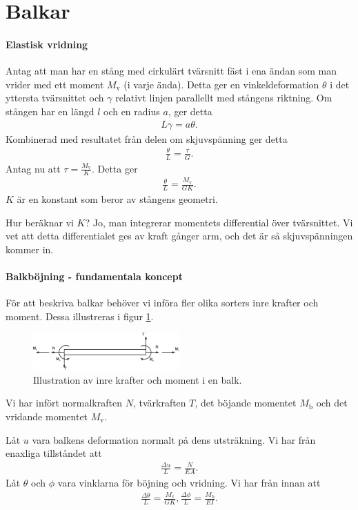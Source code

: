 \section{Balkar}

\paragraph{Elastisk vridning}
Antag att man har en stång med cirkulärt tvärsnitt fäst i ena ändan som man vrider med ett moment $M_{\text{v}}$ (i varje ända). Detta ger en vinkeldeformation $\theta$ i det yttersta tvärsnittet och $\gamma$ relativt linjen parallellt med stångens riktning. Om stången har en längd $l$ och en radius $a$, ger detta
\begin{align*}
	L\gamma = a\theta.
\end{align*}
Kombinerad med resultatet från delen om skjuvspänning ger detta
\begin{align*}
	\frac{\theta}{L} = \frac{\tau}{G}.
\end{align*}
Antag nu att $\tau = \frac{M_{\text{v}}}{K}$. Detta ger
\begin{align*}
	\frac{\theta}{L} = \frac{M_{\text{v}}}{GK}.
\end{align*}
$K$ är en konstant som beror av stångens geometri.

Hur beräknar vi $K$? Jo, man integrerar momentets differential över tvärsnittet. Vi vet att detta differentialet ges av kraft gånger arm, och det är så skjuvspänningen kommer in.

\paragraph{Balkböjning - fundamentala koncept}
För att beskriva balkar behöver vi införa fler olika sorters inre krafter och moment. Dessa illustreras i figur \ref{fig:beam_forces}.
\begin{figure}[!ht]
	\centering
	\includegraphics[width = 0.5\textwidth]{./Images/beam_forces.eps}
	\caption{Illustration av inre krafter och moment i en balk.}
	\label{fig:beam_forces}
\end{figure}
Vi har infört normalkraften $N$, tvärkraften $T$, det böjande momentet $M_{\text{b}}$ och det vridande momentet $M_{\text{v}}$.

Låt $u$ vara balkens deformation normalt på dens utsträkning. Vi har från enaxliga tillståndet att
\begin{align*}
	\frac{\Delta u}{L} = \frac{N}{EA}.
\end{align*}
Låt $\theta$ och $\phi$ vara vinklarna för böjning och vridning. Vi har från innan att
\begin{align*}
	\frac{\Delta\theta}{L} = \frac{M_{\text{v}}}{GK},
	\frac{\Delta\phi}{L} = \frac{M_{\text{b}}}{EI}.
\end{align*}

